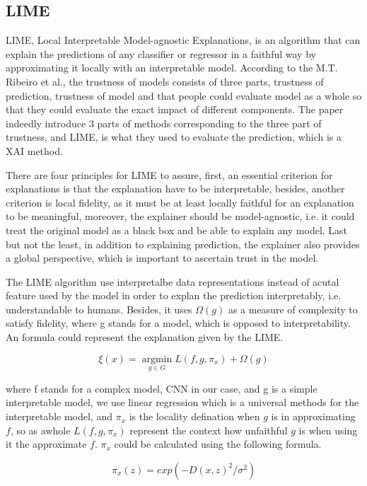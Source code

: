 \documentclass[conference]{IEEEtran}
\begin{document}
\subsection{LIME}

LIME, Local Interpretable Model-agnostic Explanations, is an algorithm that can explain the predictions of any classifier or regressor in a faithful way by approximating it locally with an interpretable model. According to the M.T. Ribeiro et al.\cite{b2}, the trustness of models consists of three parts, trustness of prediction, trustness of model and that people could evaluate model as a whole so that they could evaluate the exact impact of different components. The paper indeedly introduce 3 parts of methods corresponding to the three part of trustness, and LIME, is what they used to evaluate the prediction, which is a XAI method.

There are four principles for LIME to assure, first, an essential criterion for explanations is that the explanation have to be interpretable, besides, another criterion is local fidelity, as it must be at least locally faithful for an explanation to be meaningful, moreover, the explainer should be model-agnostic, i.e. it could treat the original model as a black box and be able to explain any model. Last but not the least, in addition to explaining prediction, the explainer also provides a global perspective, which is important to ascertain trust in the model.

The LIME algorithm use interpretalbe data representations instead of acutal feature used by the model in order to explan the prediction interpretably, i.e. understandable to humans. Besides, it uses $\Omega(g)$ as a measure of complexity to satisfy fidelity, where g stands for a model, which is opposed to interpretability. An formula could represent the explanation given by the LIME.

$$\xi(x)=\mathop{argmin}\limits_{g\in{G}}L(f,g,{\pi}_{x})+{\Omega}(g)$$

where f stands for a complex model, CNN in our case, and g is a simple interpretable model, we use linear regression which is a universal methods for the interpretable model, and ${\pi}_{x}$ is the locality defination when $g$ is in approximating $f$, so as awhole $L(f,g,{\pi}_{x})$ represent the context how unfaithful $g$ is when using it the approximate $f$. ${\pi}_{x}$ could be calculated using the following formula.

$${\pi}_{x}(z)=exp(-D{(x,z)}^{2}/{\sigma}^2)$$
\end{document}
